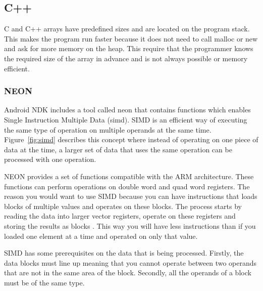 \subsection{C++}
C and C++ arrays have predefined sizes and are located on the program stack. This makes the program run faster because it does not need to call malloc or new and ask for more memory on the heap. This require that the programmer knows the required size of the array in advance and is not always possible or memory efficient.


\subsubsection{NEON}
Android NDK includes a tool called \gls{neon} that contains functions which enables Single Instruction Multiple Data (\gls{simd}). SIMD is an efficient way of executing the same type of operation on multiple operands at the same time. Figure~\ref{fig:simd} describes this concept where instead of operating on one piece of data at the time, a larger set of data that uses the same operation can be processed with one operation.

NEON provides a set of functions compatible with the ARM architecture. These functions can perform operations on double word and quad word registers. The reason you would want to use SIMD because you can have instructions that loads blocks of multiple values and operates on these blocks.  The process starts by reading the data into larger vector registers, operate on these registers and storing the results as blocks \cite{simd:expl}. This way you will have less instructions than if you loaded one element at a time and operated on only that value.

SIMD has some prerequisites on the data that is being processed. Firstly, the data blocks must line up meaning that you cannot operate between two operands that are not in the same area of the block. Secondly, all the operands of a block must be of the same type.

